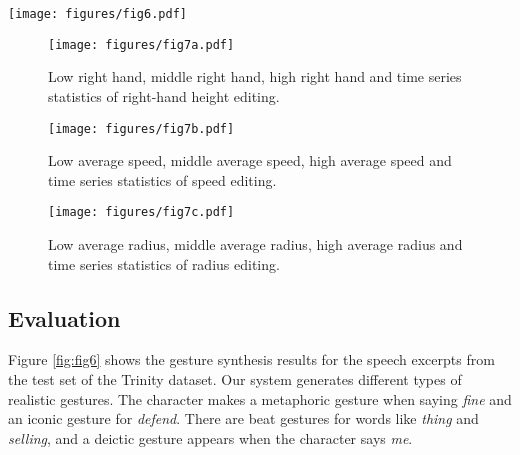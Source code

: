 \documentclass[acmtog,authorversion]{acmart}
\begin{document}
\begin{figure*}[t]
    \centering
    \texttt{[image: figures/fig6.pdf]}
    \caption{Qualitative results on the gestures synthesized by our method for four sample speech excerpts from the Trinity Gesture dataset \cite{ferstl2018investigating}. The character makes a metaphoric gesture when saying \emph{fine} and an iconic gesture for \emph{defend}. There are beat gestures for the words like \emph{thing} and \emph{selling}, and a deictic gesture appears when the character says \emph{me}. The drawing of this figure is inspired by \cite{yoon2020speech}.}
    \Description{}
    \label{fig:fig6}
\end{figure*}

\begin{figure*}[t]
    \centering
    \begin{subfigure}[t]{\textwidth}
        \centering
        \texttt{[image: figures/fig7a.pdf]}
        \caption{Low right hand, middle right hand, high right hand and time series statistics of right-hand height editing.}
        \label{fig:fig7a}
    \end{subfigure}
    \begin{subfigure}[t]{\textwidth}
        \centering
        \texttt{[image: figures/fig7b.pdf]}
        \caption{Low average speed, middle average speed, high average speed and time series statistics of speed editing.}
        \label{fig:fig7b}
    \end{subfigure}
    \begin{subfigure}[t]{\textwidth}
        \centering
        \texttt{[image: figures/fig7c.pdf]}
        \caption{Low average radius, middle average radius, high average radius and time series statistics of radius editing.}
        \label{fig:fig7c}
    \end{subfigure}
    \caption{Results of style editing for the right-hand height (the first row), the hand speed (the second row), and the hand radius (the third row). The graphs on the right show the editing input (flat line) and the corresponding values of the output motions. The box plots show the statistics of the output.}
    \label{fig:fig7}
    \Description{}
\end{figure*}

\subsection{Evaluation}
\label{subsec:evaluation}
Figure \ref{fig:fig6} shows the gesture synthesis results for the speech excerpts from the test set of the Trinity dataset. Our system generates different types of realistic gestures. The character makes a metaphoric gesture when saying \emph{fine} and an iconic gesture for \emph{defend}. There are beat gestures for words like \emph{thing} and \emph{selling}, and a deictic gesture appears when the character says \emph{me}.
\end{document}
